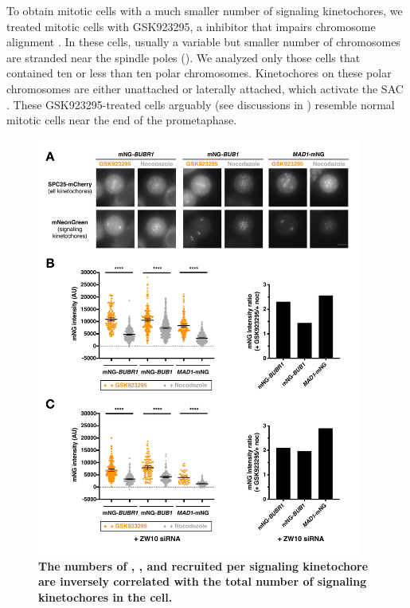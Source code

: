 To obtain mitotic cells with a much smaller number of signaling kinetochores, we treated mitotic cells with GSK923295, a  inhibitor that impairs chromosome alignment \cite{GSK923295}. In these cells, usually a variable but smaller number of chromosomes are stranded near the spindle poles (). We analyzed only those cells that contained ten or less than ten polar chromosomes. Kinetochores on these polar chromosomes are either unattached or laterally attached, which activate the SAC \cite{GSK923295LateralAttachmentEM, GSK923295MonastrolCotreatment}. These GSK923295-treated cells arguably (see discussions in ) resemble normal mitotic cells near the end of the prometaphase.

\begin{figure}
    \centering
    \includegraphics[width=0.95\textwidth]{chapters/figures/SACProteinKinetochoreRecruitment.pdf}
    \caption{\textbf{The numbers of , , and  recruited per signaling kinetochore are inversely correlated with the total number of signaling kinetochores in the cell.}}
    \label{SACProteinKinetochoreRecruitment}
\end{figure}
